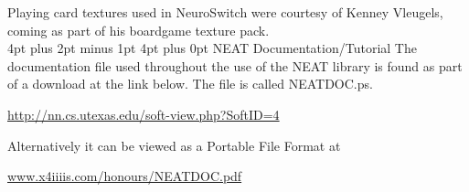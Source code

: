 \documentclass[12pt,a4paper]{article}
\makeatletter
\renewcommand\section{\@startsection {section}{1}{0mm} %
                               {4pt plus 2pt minus 1pt} %
                               {4pt plus 0pt} %
                               {\bfseries}}
\makeatother
\begin{document}
\begin{appendices}
Playing card textures used in NeuroSwitch were courtesy of Kenney Vleugels, coming as part of his boardgame texture pack.\\

\newpage
\section{NEAT Documentation/Tutorial}
The documentation file used throughout the use of the NEAT library is found as part of a download at the link below. The file is called NEATDOC.ps.

\begin{center}
\href{http://www.cs.utexas.edu/users/nn/downloads/software/neat.1.1.tar.gz}{http://nn.cs.utexas.edu/soft-view.php?SoftID=4}
\end{center}

Alternatively it can be viewed as a Portable File Format at

\begin{center}
	\href{http://x4iiiis.com/honours/NEATDOC.pdf}{www.x4iiiis.com/honours/NEATDOC.pdf}
\end{center}


\end{appendices}
\end{document}
